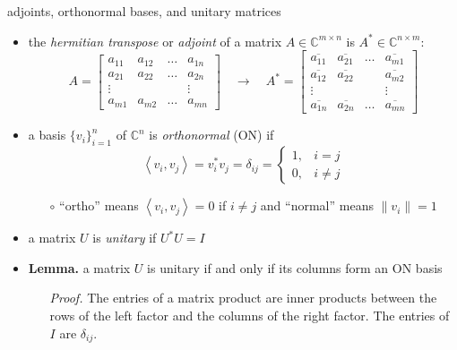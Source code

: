 \documentclass[10pt,hyperref]{beamer}
\newcommand{\CC}{\mathbb{C}}
\newcommand{\ip}[2]{\left<#1,#2\right>}
\begin{document}
\begin{frame}{adjoints, orthonormal bases, and unitary matrices}

\begin{itemize}
\item the \emph{hermitian transpose} or \emph{adjoint} of a matrix $A\in \CC^{m\times n}$ is $A^* \in \CC^{n\times m}$:
    $$A = \begin{bmatrix}
    a_{11} & a_{12} & \dots & a_{1n} \\
    a_{21} & a_{22} & \dots & a_{2n} \\
    \vdots &        &       & \vdots \\
    a_{m1} & a_{m2} & \dots & a_{mn} \end{bmatrix}
    \quad \to \quad
    A^* = \begin{bmatrix}
    \overline{a_{11}} & \overline{a_{21}} & \dots & \overline{a_{m1}} \\
    \overline{a_{12}} & \overline{a_{22}} &       & \overline{a_{m2}} \\
    \vdots            &                   &       & \vdots \\
    \overline{a_{1n}} & \overline{a_{2n}} & \dots & \overline{a_{mn}} \end{bmatrix}$$
\item a basis $\{v_i\}_{i=1}^n$ of $\CC^n$ is \emph{orthonormal} (ON) if
\small
    $$\ip{v_i}{v_j} =v_i^* v_j = \delta_{ij} = \begin{cases} 1, & i=j \\ 0, & i\ne j \end{cases}$$
\normalsize
\vspace{-2mm}
    \begin{itemize}
    \item[$\circ$] ``ortho'' means $\ip{v_i}{v_j}=0$ if $i\ne j$ and ``normal'' means $\|v_i\|=1$
    \end{itemize}
\item a matrix $U$ is \emph{unitary} if $U^* U = I$
\item \textbf{Lemma.} a matrix $U$ is unitary if and only if its columns form an ON basis
    \begin{itemize}
    \item[\emph{Proof.}] The entries of a matrix product are inner products between the rows of the left factor and the columns of the right factor.  The entries of $I$ are $\delta_{ij}$.
    \end{itemize}
\end{itemize}
\end{frame}
\end{document}
